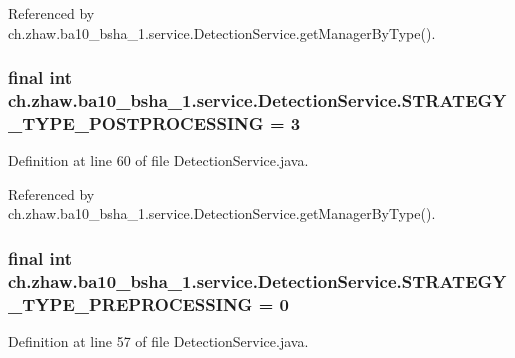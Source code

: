 Referenced by ch.zhaw.ba10\_\-bsha\_\-1.service.DetectionService.getManagerByType().\hypertarget{classch_1_1zhaw_1_1ba10__bsha__1_1_1service_1_1DetectionService_a0a5532caf09d48e950372c1b0de3e328}{
\subsubsection[{STRATEGY\_\-TYPE\_\-POSTPROCESSING}]{\setlength{\rightskip}{0pt plus 5cm}final int {\bf ch.zhaw.ba10\_\-bsha\_\-1.service.DetectionService.STRATEGY\_\-TYPE\_\-POSTPROCESSING} = 3}}
\label{classch_1_1zhaw_1_1ba10__bsha__1_1_1service_1_1DetectionService_a0a5532caf09d48e950372c1b0de3e328}


Definition at line 60 of file DetectionService.java.

Referenced by ch.zhaw.ba10\_\-bsha\_\-1.service.DetectionService.getManagerByType().\hypertarget{classch_1_1zhaw_1_1ba10__bsha__1_1_1service_1_1DetectionService_a618391553bffc271f3d62fc4b1705c34}{
\subsubsection[{STRATEGY\_\-TYPE\_\-PREPROCESSING}]{\setlength{\rightskip}{0pt plus 5cm}final int {\bf ch.zhaw.ba10\_\-bsha\_\-1.service.DetectionService.STRATEGY\_\-TYPE\_\-PREPROCESSING} = 0}}
\label{classch_1_1zhaw_1_1ba10__bsha__1_1_1service_1_1DetectionService_a618391553bffc271f3d62fc4b1705c34}


Definition at line 57 of file DetectionService.java.

